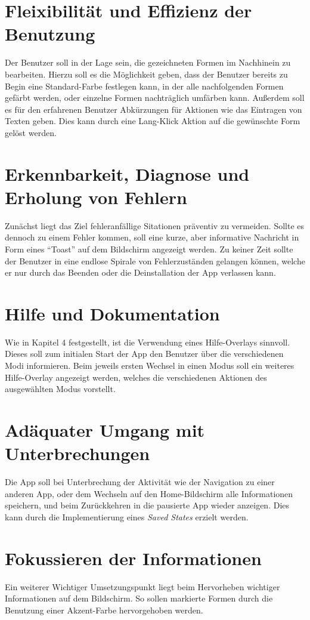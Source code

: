 \section{Fleixibilität und Effizienz der Benutzung}
Der Benutzer soll in der Lage sein, die gezeichneten Formen im Nachhinein zu bearbeiten.
Hierzu soll es die Möglichkeit geben, dass der Benutzer bereits zu Begin eine Standard-Farbe festlegen kann, in der alle nachfolgenden Formen gefärbt werden, oder einzelne Formen nachträglich umfärben kann.
Außerdem soll es für den erfahrenen Benutzer Abkürzungen für Aktionen wie das Eintragen von Texten geben.
Dies kann durch eine Lang-Klick Aktion auf die gewünschte Form gelöst werden.

\section{Erkennbarkeit, Diagnose und Erholung von Fehlern}
Zunächst liegt das Ziel fehleranfällige Sitationen präventiv zu vermeiden.
Sollte es dennoch zu einem Fehler kommen, soll eine kurze, aber informative Nachricht in Form eines ``Toast'' auf dem Bildschirm angezeigt werden.
Zu keiner Zeit sollte der Benutzer in eine endlose Spirale von Fehlerzuständen gelangen können, welche er nur durch das Beenden oder die Deinstallation der App verlassen kann.

\section{Hilfe und Dokumentation}
Wie in Kapitel 4 festgestellt, ist die Verwendung eines Hilfe-Overlays sinnvoll.
Dieses soll zum initialen Start der App den Benutzer über die verschiedenen Modi informieren.
Beim jeweils ersten Wechsel in einen Modus soll ein weiteres Hilfe-Overlay angezeigt werden, welches die verschiedenen Aktionen des ausgewählten Modus vorstellt.

\section{Adäquater Umgang mit Unterbrechungen}
Die App soll bei Unterbrechung der Aktivität wie der Navigation zu einer anderen App, oder dem Wechseln auf den Home-Bildschirm alle Informationen speichern, und beim Zurückkehren in die pausierte App wieder anzeigen.
Dies kann durch die Implementierung eines \emph{Saved States} erzielt werden.

\section{Fokussieren der Informationen}
Ein weiterer Wichtiger Umsetzungspunkt liegt beim Hervorheben wichtiger Informationen auf dem Bildschirm.
So sollen markierte Formen durch die Benutzung einer Akzent-Farbe hervorgehoben werden.

